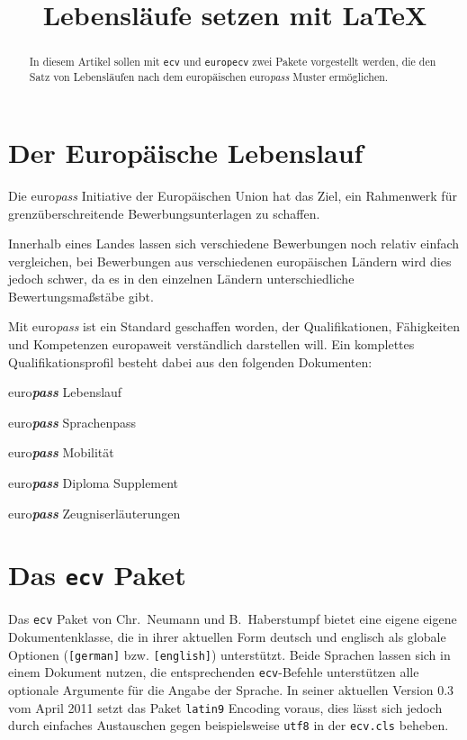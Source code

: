 \documentclass[ngerman]{dtk}
\title{\ep Lebensläufe setzen mit \LaTeX}
\newcommand{\ep}{euro\textit{pass}\xspace}
\begin{document}
\maketitle
{}

\begin{abstract}
In diesem Artikel sollen mit \texttt{ecv} und \texttt{europecv} zwei Pakete vorgestellt werden, die den Satz von Lebensläufen nach dem europäischen euro\textit{pass} Muster ermöglichen.
\end{abstract} 

\section{Der Europäische Lebenslauf}

Die \ep Initiative der Europäischen Union hat das Ziel, ein Rahmenwerk für grenzüberschreitende Bewerbungsunterlagen zu schaffen. 

Innerhalb eines Landes lassen sich verschiedene Bewerbungen noch relativ einfach vergleichen, bei Bewerbungen aus verschiedenen europäischen Ländern wird dies jedoch schwer, da es in den einzelnen Ländern unterschiedliche Bewertungsmaßstäbe gibt.

Mit \ep ist ein Standard geschaffen worden, der Qualifikationen, Fähigkeiten und Kompetenzen europaweit verständlich darstellen will. Ein komplettes Qualifikationsprofil besteht dabei aus den folgenden Dokumenten:

\begin{compactitem}
\item euro\textbf{\textit{pass}} Lebenslauf
\item euro\textbf{\textit{pass}} Sprachenpass
\item euro\textbf{\textit{pass}} Mobilität
\item euro\textbf{\textit{pass}} Diploma Supplement
\item euro\textbf{\textit{pass}} Zeugniserläuterungen
\end{compactitem}


\section{Das \texttt{ecv} Paket}

Das \texttt{ecv} Paket von Chr.~Neumann und B.~Haberstumpf bietet eine eigene eigene Dokumentenklasse, die in ihrer aktuellen Form deutsch und englisch als globale Optionen (\texttt{[german]} bzw. \texttt{[english]}) unterstützt. Beide Sprachen lassen sich in einem Dokument nutzen, die entsprechenden \texttt{ecv}-Befehle unterstützen alle optionale Argumente für die Angabe der Sprache. In seiner aktuellen Version 0.3 vom April 2011 setzt das Paket \texttt{latin9} Encoding voraus, dies lässt sich jedoch durch einfaches Austauschen gegen beispielsweise \texttt{utf8} in der \texttt{ecv.cls} beheben.
\end{document}
